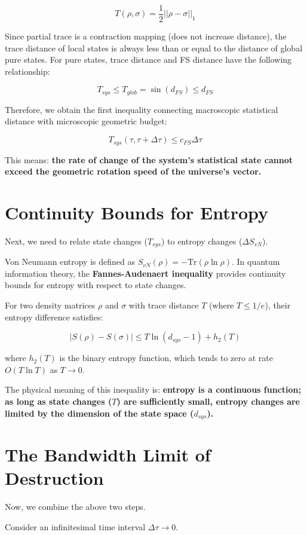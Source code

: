 \[T(\rho, \sigma) = \frac{1}{2} || \rho - \sigma ||_1\]

Since partial trace is a contraction mapping (does not increase distance), the trace distance of local states is always less than or equal to the distance of global pure states. For pure states, trace distance and FS distance have the following relationship:

\[T_{sys} \le T_{glob} = \sin(d_{FS}) \le d_{FS}\]

Therefore, we obtain the first inequality connecting macroscopic statistical distance with microscopic geometric budget:

\[T_{sys}(\tau, \tau+\Delta\tau) \le c_{FS} \Delta\tau\]

This means: \textbf{the rate of change of the system's statistical state cannot exceed the geometric rotation speed of the universe's vector.}

\section{Continuity Bounds for Entropy}

Next, we need to relate state changes ($T_{sys}$) to entropy changes ($\Delta S_{vN}$).

Von Neumann entropy is defined as $S_{vN}(\rho) = -\text{Tr}(\rho \ln \rho)$. In quantum information theory, the \textbf{Fannes-Audenaert inequality} provides continuity bounds for entropy with respect to state changes.

For two density matrices $\rho$ and $\sigma$ with trace distance $T$ (where $T \le 1/e$), their entropy difference satisfies:

\[|S(\rho) - S(\sigma)| \le T \ln(d_{sys}-1) + h_2(T)\]

where $h_2(T)$ is the binary entropy function, which tends to zero at rate $O(T \ln T)$ as $T \to 0$.

The physical meaning of this inequality is: \textbf{entropy is a continuous function; as long as state changes ($T$) are sufficiently small, entropy changes are limited by the dimension of the state space ($d_{sys}$).}

\section{The Bandwidth Limit of Destruction}

Now, we combine the above two steps.

Consider an infinitesimal time interval $\Delta\tau \to 0$.

